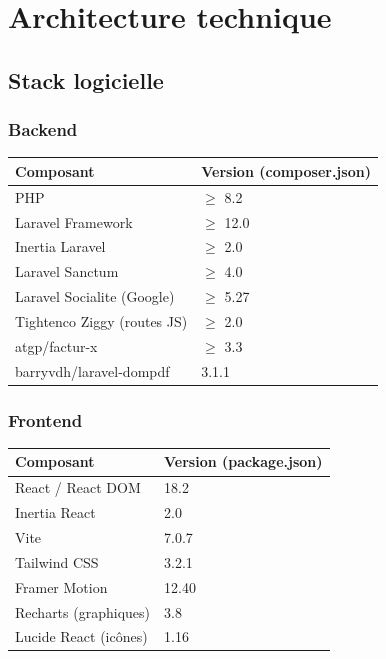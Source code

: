 \documentclass[11pt,a4paper]{report}
\begin{document}
\chapter{Architecture technique}

\section{Stack logicielle}

\subsection{Backend}

\begin{center}
\begin{tabular}{@{}ll@{}}
\toprule
\textbf{Composant} & \textbf{Version (composer.json)} \\
\midrule
PHP & $\geq$ 8.2 \\
Laravel Framework & $\geq$ 12.0 \\
Inertia Laravel & $\geq$ 2.0 \\
Laravel Sanctum & $\geq$ 4.0 \\
Laravel Socialite (Google) & $\geq$ 5.27 \\
Tightenco Ziggy (routes JS) & $\geq$ 2.0 \\
atgp/factur-x & $\geq$ 3.3 \\
barryvdh/laravel-dompdf & 3.1.1 \\
\bottomrule
\end{tabular}
\end{center}

\subsection{Frontend}

\begin{center}
\begin{tabular}{@{}ll@{}}
\toprule
\textbf{Composant} & \textbf{Version (package.json)} \\
\midrule
React / React DOM & 18.2 \\
Inertia React & 2.0 \\
Vite & 7.0.7 \\
Tailwind CSS & 3.2.1 \\
Framer Motion & 12.40 \\
Recharts (graphiques) & 3.8 \\
Lucide React (icônes) & 1.16 \\
\bottomrule
\end{tabular}
\end{center}
\end{document}
